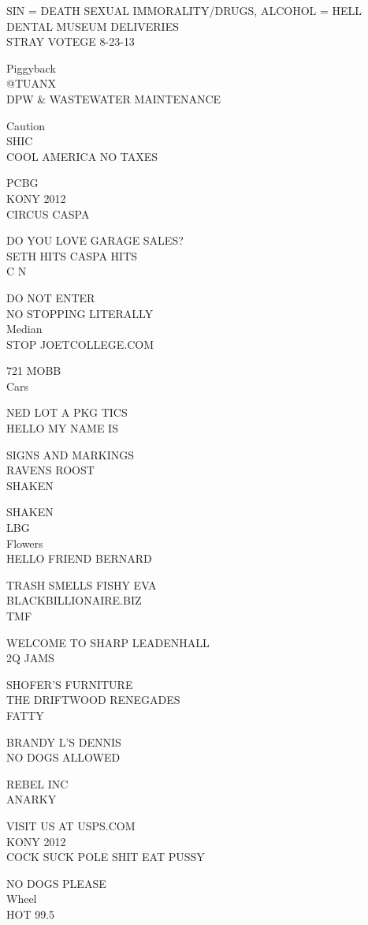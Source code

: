 \documentclass[10pt,letterpaper]{article}
\begin{document}
SIN = DEATH SEXUAL IMMORALITY/DRUGS, ALCOHOL = HELL\\
DENTAL MUSEUM DELIVERIES\\
STRAY VOTEGE 8{-}23{-}13

Piggyback\\
@TUANX\\
DPW \& WASTEWATER MAINTENANCE

Caution\\
SHIC\\
COOL AMERICA NO TAXES

PCBG\\
KONY 2012\\
CIRCUS CASPA

DO YOU LOVE GARAGE SALES?\\
SETH HITS CASPA HITS\\
C N

DO NOT ENTER\\
NO STOPPING LITERALLY\\
Median\\
STOP JOETCOLLEGE.COM

721 MOBB\\
Cars

NED LOT A PKG TICS\\
HELLO MY NAME IS

SIGNS AND MARKINGS\\
RAVENS ROOST\\
SHAKEN

SHAKEN\\
LBG\\
Flowers\\
HELLO FRIEND BERNARD

TRASH SMELLS FISHY EVA\\
BLACKBILLIONAIRE.BIZ\\
TMF

WELCOME TO SHARP LEADENHALL\\
2Q JAMS

SHOFER'S FURNITURE\\
THE DRIFTWOOD RENEGADES\\
FATTY

BRANDY L'S DENNIS\\
NO DOGS ALLOWED

REBEL INC\\
ANARKY

VISIT US AT USPS.COM\\
KONY 2012\\
COCK SUCK POLE SHIT EAT PUSSY

NO DOGS PLEASE\\
Wheel\\
HOT 99.5
\end{document}
